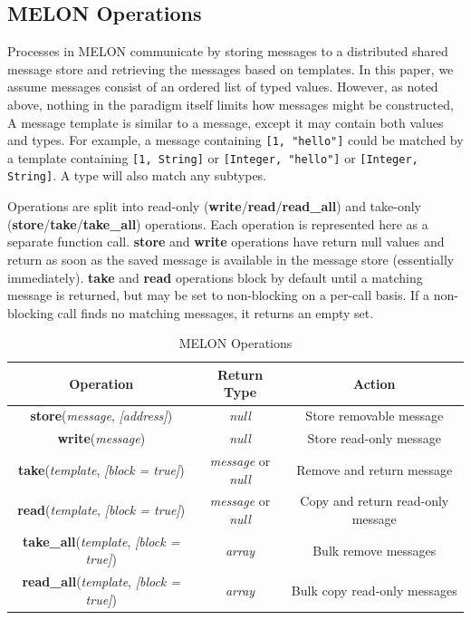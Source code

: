\documentclass{llncs}
\begin{document}
\subsection{MELON Operations}\label{melon}

Processes in MELON communicate by storing messages to a distributed shared message store and retrieving the messages based on templates. In this paper, we assume messages consist of an ordered list of typed values. However, as noted above, nothing in the paradigm itself limits how messages might be constructed,  A message template is similar to a message, except it may contain both values and types. For example, a message containing \texttt{[1, "hello"]} could be matched by a template containing \texttt{[1, String]} or \texttt{[Integer, "hello"]} or \texttt{[Integer, String]}. A type will also match any subtypes.

Operations are split into read-only (\textbf{write}/\textbf{read}/\textbf{read\_all}) and take-only (\textbf{store}/\textbf{take}/\textbf{take\_all}) operations. Each operation is represented here as a separate function call. \textbf{store} and \textbf{write} operations have return null values and return as soon as the saved message is available in the message store (essentially immediately). \textbf{take} and \textbf{read} operations block by default until a matching message is returned, but may be set to non-blocking on a per-call basis. If a non-blocking call finds no matching messages, it returns an empty set.

\begin{table}
\centering
\begin{tabular}{|c|c|c|}
\hline
\textbf{Operation} & \textbf{Return Type} & \textbf{Action} \\ \hline
\textbf{store}(\textit{message}, \textit{[address]}) & \textit{null} & Store removable message \\ \hline
\textbf{write}(\textit{message}) & \textit{null} & Store read-only message \\ \hline
\textbf{take}(\textit{template}, \textit{[block = true]}) & \textit{message} or \textit{null} & Remove and return message \\ \hline
\textbf{read}(\textit{template}, \textit{[block = true]}) & \textit{message} or \textit{null} & Copy and return read-only message \\ \hline
\textbf{take\_all}(\textit{template}, \textit{[block = true]}) & \textit{array} & Bulk remove messages \\ \hline
\textbf{read\_all}(\textit{template}, \textit{[block = true]}) & \textit{array} & Bulk copy read-only messages \\ \hline
\end{tabular}
\caption{MELON Operations}
\end{table}
\end{document}
